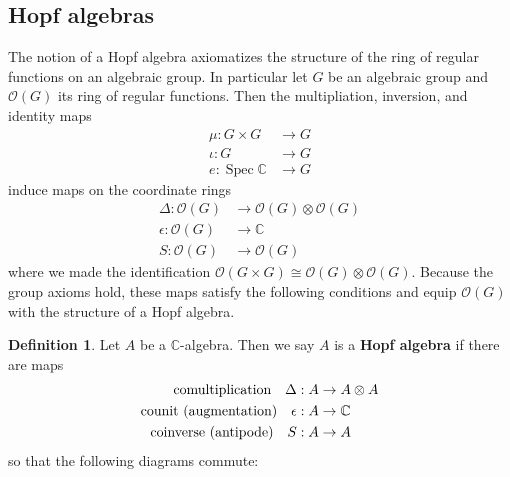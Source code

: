 \documentclass[manuscript, printscheme]{aomart}
\theoremstyle{plain} %
\theoremstyle{definition}
\newtheorem{definition}[equation]{Definition}
\theoremstyle{remark}
\DeclareMathOperator{\id}{id}
\newcommand{\C}{\mathbb{C}}
\DeclareMathOperator{\Spec}{Spec}
\newcommand{\mc}[1]{\mathcal{#1}}
\begin{document}
\subsection{Hopf algebras}
The notion of a Hopf algebra axiomatizes
the structure of the ring of regular functions on an algebraic group.
In particular let $G$ be an algebraic group and $\mc O(G)$ its ring of regular functions.
Then the multipliation,
inversion, and identity maps \begin{align*}
	\mu: G\times G & \to G \\
	\iota: G       & \to G \\
	e: \Spec \C    & \to G
\end{align*}
induce maps on the coordinate rings
\begin{align*}
	\Delta: \mc O(G)   & \to \mc O(G)\otimes \mc O(G) \\
	\epsilon: \mc O(G) & \to \C                       \\
	S: \mc O(G)        & \to \mc O(G)
\end{align*} where we made the identification $\mc O(G\times G) \cong \mc O(G)\otimes \mc O(G)$.
Because the group axioms hold, these maps satisfy the following conditions and equip
$\mc O(G)$ with the structure of a Hopf algebra.
\begin{definition}\label{def:hopf}
	Let $A$ be a $\C$-algebra. Then we say $A$ is a \textbf{Hopf algebra} if there are maps \begin{align*}
		\text{comultiplication\quad}\Delta: A        & \to A\otimes A \\
		\text{counit (augmentation)\quad}\epsilon: A & \to \C         \\
		\text{coinverse (antipode)\quad}S: A         & \to A
	\end{align*}
	so that the following diagrams commute:
	\begin{center}
		 \\
		\vspace{5mm}
		 \\
		\vspace{5mm}

	\end{center}
\end{definition}
\end{document}
